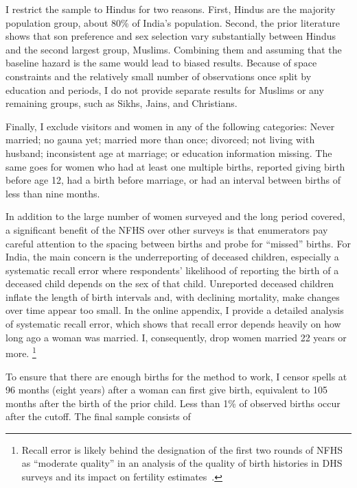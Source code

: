 \documentclass[12pt,letterpaper]{article}
\begin{document}
I restrict the sample to Hindus for two reasons.
First, Hindus are the majority population group, about 80\% of India’s population.
Second, the prior literature shows that son preference and sex selection vary 
substantially between Hindus and the second largest group, Muslims. 
Combining them and assuming that the baseline hazard is the same would lead to biased 
results.
Because of space constraints and the relatively small number of observations once split 
by education and periods, I do not provide separate results for Muslims or any  
remaining groups, such as Sikhs, Jains, and Christians.

Finally, I exclude visitors and women in any of the following categories: Never married; 
no gauna yet; married more than once; divorced; not living with husband; inconsistent age 
at marriage; or education information missing.  
The same goes for women who had at least one multiple births, reported giving birth 
before age 12, had a birth before marriage, or had an interval between births of less than 
nine months. 

In addition to the large number of women surveyed and the long period covered, a significant 
benefit of the NFHS over other surveys is that enumerators pay careful attention to the 
spacing between births and probe for ``missed'' births.
For India, the main concern is the underreporting of deceased children, especially a systematic 
recall error where respondents' likelihood of reporting the birth of a deceased child depends 
on the sex of that child.
Unreported deceased children inflate the length of birth intervals and, with declining mortality, 
make changes over time appear too small.
In the online appendix, I provide a detailed analysis of systematic recall error, which 
shows that recall error depends heavily on how long ago a woman was married. 
I, consequently, drop women married 22 years or more.%
\footnote{
Recall error is likely behind the designation of the first two rounds of NFHS as ``moderate 
quality'' in an analysis of the quality of birth histories in DHS surveys and its impact 
on fertility estimates \citep{Schoumaker2014}.
}

To ensure that there are enough births for the method to work, I censor spells at 96 
months (eight years) after a woman can first give birth, equivalent to 105 months 
after the birth of the prior child.
Less than 1\% of observed births occur after the cutoff.
The final sample consists of 

\end{document}
